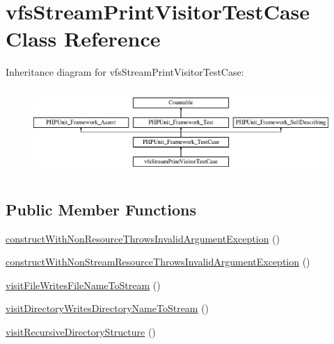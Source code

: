 \hypertarget{classorg_1_1bovigo_1_1vfs_1_1visitor_1_1vfs_stream_print_visitor_test_case}{}\section{vfs\+Stream\+Print\+Visitor\+Test\+Case Class Reference}
\label{classorg_1_1bovigo_1_1vfs_1_1visitor_1_1vfs_stream_print_visitor_test_case}
Inheritance diagram for vfs\+Stream\+Print\+Visitor\+Test\+Case\+:\begin{figure}[H]
\begin{center}
\leavevmode
\includegraphics[height=3.303835cm]{classorg_1_1bovigo_1_1vfs_1_1visitor_1_1vfs_stream_print_visitor_test_case}
\end{center}
\end{figure}
\subsection*{Public Member Functions}
\begin{DoxyCompactItemize}
\item 
\mbox{\hyperlink{classorg_1_1bovigo_1_1vfs_1_1visitor_1_1vfs_stream_print_visitor_test_case_a8e3f9349976bfcb3ea7c12b87a42e130}{construct\+With\+Non\+Resource\+Throws\+Invalid\+Argument\+Exception}} ()
\item 
\mbox{\hyperlink{classorg_1_1bovigo_1_1vfs_1_1visitor_1_1vfs_stream_print_visitor_test_case_a1a1c336e6867a0c0e310bd9ce03b3466}{construct\+With\+Non\+Stream\+Resource\+Throws\+Invalid\+Argument\+Exception}} ()
\item 
\mbox{\hyperlink{classorg_1_1bovigo_1_1vfs_1_1visitor_1_1vfs_stream_print_visitor_test_case_a2f12360e84db7ec329996906116cc8c4}{visit\+File\+Writes\+File\+Name\+To\+Stream}} ()
\item 
\mbox{\hyperlink{classorg_1_1bovigo_1_1vfs_1_1visitor_1_1vfs_stream_print_visitor_test_case_a65d3929fe0d3ec7b20d200ac62809dfd}{visit\+Directory\+Writes\+Directory\+Name\+To\+Stream}} ()
\item 
\mbox{\hyperlink{classorg_1_1bovigo_1_1vfs_1_1visitor_1_1vfs_stream_print_visitor_test_case_a202111a702388c51ecd2374ffc20fa6c}{visit\+Recursive\+Directory\+Structure}} ()
\end{DoxyCompactItemize}
